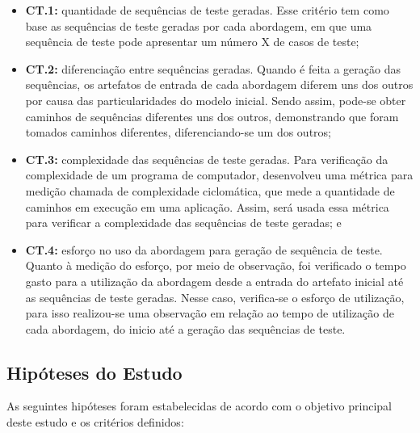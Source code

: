 \begin{itemize}
	\item \textbf{CT.1:} quantidade de sequências de teste geradas. Esse critério tem como base as sequências de teste geradas por cada abordagem, em que uma sequência de teste pode apresentar um número X de casos de teste;
	\item \textbf{CT.2:} diferenciação entre sequências geradas. Quando é feita a geração das sequências, os artefatos de entrada de cada abordagem diferem uns dos outros por causa das particularidades do modelo inicial. Sendo assim, pode-se obter caminhos de sequências diferentes uns dos outros, demonstrando que foram tomados caminhos diferentes, diferenciando-se um dos outros;
	\item \textbf{CT.3:} complexidade das sequências de teste geradas. Para verificação da complexidade de um programa de computador, \citet{mccabe1976complexity} desenvolveu uma métrica para medição chamada de complexidade ciclomática, que mede a quantidade de caminhos em execução em uma aplicação. Assim, será usada essa métrica para verificar a complexidade das sequências de teste geradas; e
	\item \textbf{CT.4:} esforço no uso da abordagem para geração de sequência de teste. Quanto à medição do esforço, por meio de observação, foi verificado o tempo gasto para a utilização da abordagem desde a entrada do artefato inicial até as sequências de teste geradas. Nesse caso, verifica-se o esforço de utilização, para isso realizou-se uma observação em relação ao tempo de utilização de cada abordagem, do inicio até a geração das sequências de teste. 
\end{itemize}


\subsection{Hipóteses do Estudo}

As seguintes hipóteses foram estabelecidas de acordo com o objetivo principal deste estudo e os critérios definidos:

